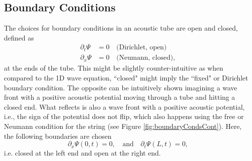 \subsection{Boundary Conditions}
The choices for boundary conditions in an acoustic tube are open and closed, defined as \cite{Bilbao2018}
\begin{subequations}\label{eq:contBoundariesBrass}
    \begin{align}
        \partial_t\Psi &= 0\quad \text{(Dirichlet, open)}\label{eq:contDirichletBrass}\\
        \partial_x\Psi &= 0\quad \text{(Neumann, closed)}\label{eq:contNeumannBrass},
    \end{align}
\end{subequations} 
at the ends of the tube. This might be slightly counter-intuitive as when compared to the 1D wave equation, ``closed" might imply the ``fixed" or Dirichlet boundary condition. The opposite can be intuitively shown imagining a wave front with a positive acoustic potential moving through a tube and hitting a closed end. What reflects is also a wave front with a positive acoustic potential, i.e., the sign of the potential does not flip, which also happens using the free or Neumann condition for the string (see Figure \ref{fig:boundaryCondsCont}).
Here, the following boundaries are chosen
\begin{equation}\label{eq:openClosed}
    \partial_x\Psi(0, t) = 0, \quad \text{and} \quad \partial_t\Psi(L, t) = 0,
\end{equation}
i.e. closed at the left end and open at the right end.

